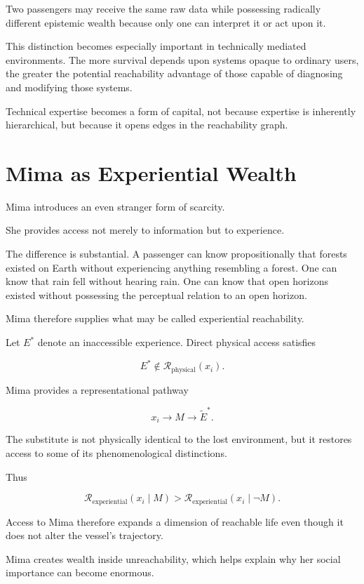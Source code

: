 \documentclass[11pt,oneside]{book}
\theoremstyle{definition}
\theoremstyle{remark}
\newcommand{\R}{\mathcal{R}}
\begin{document}
Two passengers may receive the same raw data while possessing radically different epistemic wealth because only one can interpret it or act upon it.

This distinction becomes especially important in technically mediated environments. The more survival depends upon systems opaque to ordinary users, the greater the potential reachability advantage of those capable of diagnosing and modifying those systems.

Technical expertise becomes a form of capital, not because expertise is inherently hierarchical, but because it opens edges in the reachability graph.

\section{Mima as Experiential Wealth}

Mima introduces an even stranger form of scarcity.

She provides access not merely to information but to experience.

The difference is substantial. A passenger can know propositionally that forests existed on Earth without experiencing anything resembling a forest. One can know that rain fell without hearing rain. One can know that open horizons existed without possessing the perceptual relation to an open horizon.

Mima therefore supplies what may be called experiential reachability.

Let \(E^\ast\) denote an inaccessible experience. Direct physical access satisfies

\[
E^\ast\notin\R_{\mathrm{physical}}(x_i).
\]

Mima provides a representational pathway

\[
x_i
\rightarrow
M
\rightarrow
\widetilde E^\ast.
\]

The substitute is not physically identical to the lost environment, but it restores access to some of its phenomenological distinctions.

Thus

\[
\R_{\mathrm{experiential}}(x_i\mid M)
>
\R_{\mathrm{experiential}}(x_i\mid \neg M).
\]

Access to Mima therefore expands a dimension of reachable life even though it does not alter the vessel's trajectory.

Mima creates wealth inside unreachability, which helps explain why her social importance can become enormous.
\end{document}
